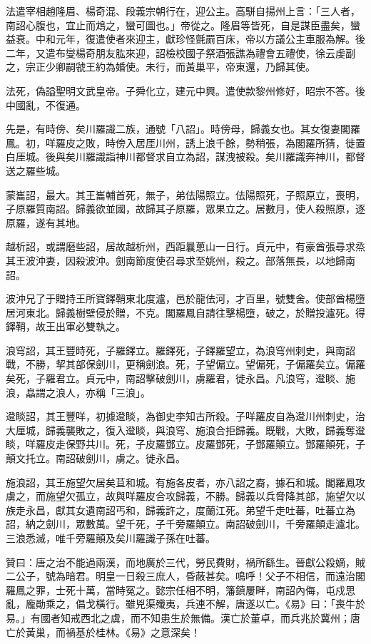 \begin{pinyinscope}
 法遣宰相趙隆眉、楊奇混、段義宗朝行在，迎公主。高駢自揚州上言：「三人者，南詔心腹也，宜止而鴆之，蠻可圖也。」帝從之。隆眉等皆死，自是謀臣盡矣，蠻益衰。中和元年，復遣使者來迎主，獻珍怪氈罽百床，帝以方議公主車服為解。後二年，又遣布燮楊奇朋友肱來迎，詔檢校國子祭酒張譙為禮會五禮使，徐云虔副之，宗正少卿嗣虢王約為婚使。未行，而黃巢平，帝東還，乃歸其使。



 法死，偽謚聖明文武皇帝。子舜化立，建元中興。遣使款黎州修好，昭宗不答。後中國亂，不復通。



 先是，有時傍、矣川羅識二族，通號「八詔」。時傍母，歸義女也。其女復妻閣羅鳳。初，咩羅皮之敗，時傍入居厓川州，誘上浪千餘，勢稍張，為閣羅所猜，徙置白厓城。後與矣川羅識詣神川都督求自立為詔，謀洩被殺。矣川羅識奔神川，都督送之羅些城。



 蒙巂詔，最大。其王巂輔首死，無子，弟佉陽照立。佉陽照死，子照原立，喪明，子原羅質南詔。歸義欲並國，故歸其子原羅，眾果立之。居數月，使人殺照原，逐原羅，遂有其地。



 越析詔，或謂磨些詔，居故越析州，西距曩蔥山一日行。貞元中，有豪酋張尋求烝其王波沖妻，因殺波沖。劍南節度使召尋求至姚州，殺之。部落無長，以地歸南詔。



 波沖兄了于贈持王所寶鐸鞘東北度瀘，邑於龍佉河，才百里，號雙舍。使部酋楊墮居河東北。歸義樹壁侵於贈，不克。閣羅鳳自請往擊楊墮，破之，於贈投瀘死。得鐸鞘，故王出軍必雙執之。



 浪穹詔，其王豐時死，子羅鐸立。羅鐸死，子鐸羅望立，為浪穹州刺史，與南詔戰，不勝，挈其部保劍川，更稱劍浪。死，子望偏立。望偏死，子偏羅矣立。偏羅矣死，子羅君立。貞元中，南詔擊破劍川，虜羅君，徙永昌。凡浪穹，邆睒、施浪，皛謂之浪人，亦稱「三浪」。



 邆睒詔，其王豐咩，初據邆睒，為御史李知古所殺。子咩羅皮自為邆川州刺史，治大厘城，歸義襲敗之，復入邆睒，與浪穹、施浪合拒歸義。既戰，大敗，歸義奪邆睒，咩羅皮走保野共川。死，子皮羅鄧立。皮羅鄧死，子鄧羅顛立。鄧羅顛死，子顛文托立。南詔破劍川，虜之。徙永昌。



 施浪詔，其王施望欠居矣苴和城。有施各皮者，亦八詔之裔，據石和城。閣羅鳳攻虜之，而施望欠孤立，故與咩羅皮合攻歸義，不勝。歸義以兵脅降其部，施望欠以族走永昌，獻其女遺南詔丐和，歸義許之，度蘭江死。弟望千走吐蕃，吐蕃立為詔，納之劍川，眾數萬。望千死，子千旁羅顛立。南詔破劍川，千旁羅顛走瀘北。三浪悉滅，唯千旁羅顛及矣川羅識子孫在吐蕃。



 贊曰：唐之治不能過兩漢，而地廣於三代，勞民費財，禍所繇生。晉獻公殺嫡，賊二公子，號為暗君。明皇一日殺三庶人，昏蔽甚矣。鳴呼！父子不相信，而遠治閣羅鳳之罪，士死十萬，當時冤之。懿宗任相不明，籓鎮屢畔，南詔內侮，屯戍思亂，龐勛乘之，倡戈橫行。雖兇渠殲夷，兵連不解，唐遂以亡。《易》曰：「喪牛於易。」有國者知戒西北之虞，而不知患生於無備。漢亡於董卓，而兵兆於冀州；唐亡於黃巢，而禍基於桂林。《易》之意深矣！



\end{pinyinscope}